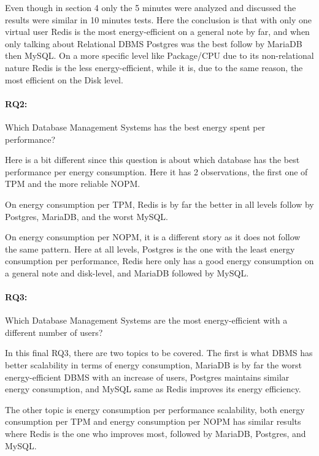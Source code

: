     Even though in section 4 only the 5 minutes were analyzed and discussed the results were similar in 10 minutes tests. Here the conclusion is that with only one virtual user Redis is the most energy-efficient on a general note by far, and when only talking about Relational DBMS Postgres was the best follow by MariaDB then MySQL. On a more specific level like Package/CPU due to its non-relational nature Redis is the less energy-efficient, while it is, due to the same reason, the most efficient on the Disk level.
    
     \paragraph{RQ2:} Which Database Management Systems has the best energy spent per performance?

Here is a bit different since this question is about which database has the best performance per energy consumption. Here it has 2 observations, the first one of TPM and the more reliable NOPM.

On energy consumption per TPM, Redis is by far the better in all levels follow by Postgres, MariaDB, and the worst MySQL.

On energy consumption per NOPM, it is a different story as it does not follow the same pattern.  Here at all levels, Postgres is the one with the least energy consumption per performance, Redis here only has a good energy consumption on a general note and disk-level, and MariaDB followed by MySQL.

     \paragraph{RQ3:} Which Database Management Systems are the most energy-efficient with a different number of users?

In this final RQ3, there are two topics to be covered. 
The first is what DBMS has better scalability in terms of energy consumption, MariaDB is by far the worst energy-efficient DBMS with an increase of users, Postgres maintains similar energy consumption, and MySQL same as Redis improves its energy efficiency.

The other topic is energy consumption per performance scalability, both energy consumption per TPM and energy consumption per NOPM has similar results where Redis is the one who improves most, followed by MariaDB, Postgres, and MySQL.








